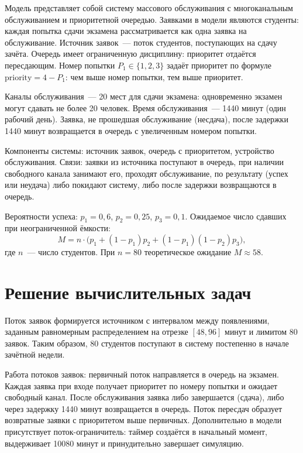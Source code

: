 \documentclass[a4paper, 14pt]{extarticle}
\begin{document}
Модель представляет собой систему массового обслуживания с многоканальным обслуживанием и приоритетной очередью. Заявками в модели являются студенты: каждая попытка сдачи экзамена рассматривается как одна заявка на обслуживание. Источник заявок~--- поток студентов, поступающих на сдачу зачёта. Очередь имеет ограниченную дисциплину: приоритет отдаётся пересдающим. Номер попытки $P_1 \in \{1, 2, 3\}$ задаёт приоритет по формуле $\text{priority} = 4 - P_1$: чем выше номер попытки, тем выше приоритет.

Каналы обслуживания~--- 20 мест для сдачи экзамена: одновременно экзамен могут сдавать не более 20 человек. Время обслуживания~--- 1440 минут (один рабочий день). Заявка, не прошедшая обслуживание (несдача), после задержки 1440 минут возвращается в очередь с увеличенным номером попытки.

Компоненты системы: источник заявок, очередь с приоритетом, устройство обслуживания. Связи: заявки из источника поступают в очередь, при наличии свободного канала занимают его, проходят обслуживание, по результату (успех или неудача) либо покидают систему, либо после задержки возвращаются в очередь.

Вероятности успеха: $p_1 = 0{,}6$, $p_2 = 0{,}25$, $p_3 = 0{,}1$. Ожидаемое число сдавших при неограниченной ёмкости:
\begin{equation}
M = n \cdot \bigl( p_1 + (1-p_1) p_2 + (1-p_1)(1-p_2) p_3 \bigr),
\end{equation}
где $n$~--- число студентов. При $n = 80$ теоретическое ожидание $M \approx 58$.

\section{Решение вычислительных задач}

Поток заявок формируется источником с интервалом между появлениями, заданным равномерным распределением на отрезке $[48, 96]$ минут и лимитом 80 заявок. Таким образом, 80 студентов поступают в систему постепенно в начале зачётной недели.

Работа потоков заявок: первичный поток направляется в очередь на экзамен. Каждая заявка при входе получает приоритет по номеру попытки и ожидает свободный канал. После обслуживания заявка либо завершается (сдача), либо через задержку 1440 минут возвращается в очередь. Поток пересдач образует возвратные заявки с приоритетом выше первичных. Дополнительно в модели присутствует поток-ограничитель: таймер создаётся в начальный момент, выдерживает 10080 минут и принудительно завершает симуляцию.
\end{document}
